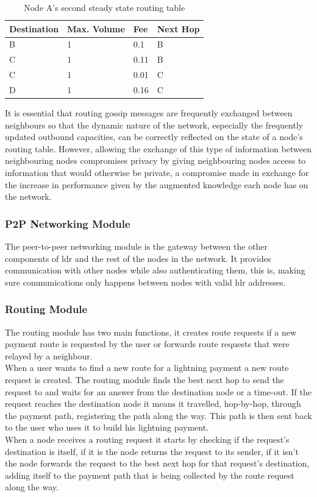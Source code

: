\begin{table}[H]
\begin{tabular}{|l|l|l|l|}
\hline
\rowcolor[HTML]{C0C0C0} 
Destination & Max. Volume   & Fee   & Next Hop \\ \hline
B           & 1             & 0.1   & B       \\ \hline
C           & 1             & 0.11  & B       \\ \hline
C           & 1             & 0.01  & C       \\ \hline
D           & 1             & 0.16  & C       \\ \hline
\end{tabular}
\caption{Node A's second steady state routing table}
\label{table:routing_table_steady_a_2}
\end{table}

It is essential that routing gossip messages are frequently exchanged between neighbours so that the dynamic nature of the network, especially the frequently updated outbound capacities, can be correctly reflected on the state of a node's routing table. However, allowing the exchange of this type of information between neighbouring nodes compromises privacy by giving neighbouring nodes access to information that would otherwise be private, a compromise made in exchange for the increase in performance given by the augmented knowledge each node has on the network.

\subsubsection{P2P Networking Module}

The peer-to-peer networking module is the gateway between the other components of \acrshort{ldr} and the rest of the nodes in the network. It provides communication with other nodes while also authenticating them, this is, making sure communications only happens between nodes with valid \acrshort{ldr} addresses.

\subsubsection{Routing Module}

The routing module has two main functions, it creates route requests if a new payment route is requested by the user or forwards route requests that were relayed by a neighbour. \\
When a user wants to find a new route for a lightning payment a new route request is created. The routing module finds the best next hop to send the request to and waits for an answer from the destination node or a time-out. If the request reaches the destination node it means it travelled, hop-by-hop, through the payment path, registering the path along the way. This path is then sent back to the user who uses it to build his lightning payment. \\
When a node receives a routing request it starts by checking if the request's destination is itself, if it is the node returns the request to its sender, if it isn't the node forwards the request to the best next hop for that request's destination, adding itself to the payment path that is being collected by the route request along the way.